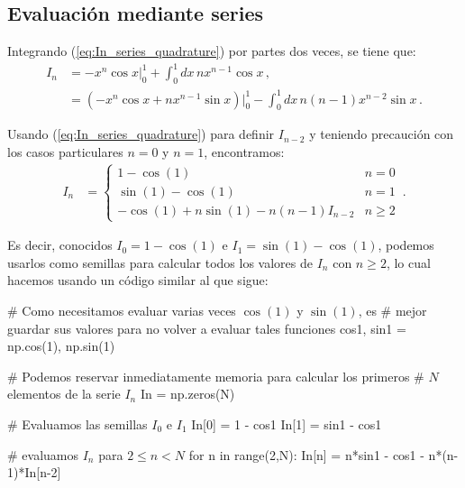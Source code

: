 \documentclass[../portafolio.tex]{subfiles}
\begin{document}
\subsection{Evaluación mediante series}
Integrando (\ref{eq:In_series_quadrature}) por partes dos veces, se tiene que:
\begin{align*}
  I_n
  &= -x^n \cos x\Bigg|_0^1 + \int_0^1 dx\, n x^{n-1} \cos x  \,, \\
  &= (-x^n \cos x + n x^{n-1} \sin x) \Bigg|_0^1 - \int_0^1 dx\, n (n-1) x^{n-2} \sin x  \,.
\end{align*}

Usando (\ref{eq:In_series_quadrature}) para definir $I_{n-2}$ y
teniendo precaución con los casos particulares $n=0$ y $n=1$,
encontramos:
\begin{align}
  \label{eq:In_series_partes}
  I_n
  &=
    \begin{cases}
      1 -\cos(1) & n=0  \\
      \sin(1)-\cos(1) & n=1 \\
    -\cos(1) + n \sin(1) - n (n-1) I_{n-2} & n\geq 2     
    \end{cases}
    \,.
\end{align}

Es decir, conocidos $I_0=1 -\cos(1)$ e $I_1=\sin(1)-\cos(1)$, podemos
usarlos como semillas para calcular todos los valores de $I_n$ con
$n\geq2$, lo cual hacemos usando un código similar al que sigue: 
\begin{pythoncode}
  # Como necesitamos evaluar varias veces $\cos(1)$ y $\sin(1)$, es
  # mejor guardar sus valores para no volver a evaluar tales funciones
  cos1, sin1 = np.cos(1), np.sin(1)

  # Podemos reservar inmediatamente memoria para calcular los primeros
  # $N$ elementos de la serie $I_n$
  In = np.zeros(N)
  
  # Evaluamos las semillas $I_0$ e $I_1$
  In[0] = 1 - cos1
  In[1] = sin1 - cos1
  
  # evaluamos $I_n$ para $2\leq n < N$
  for n in range(2,N):
      In[n] = n*sin1 - cos1 - n*(n-1)*In[n-2]
\end{pythoncode}
\end{document}
